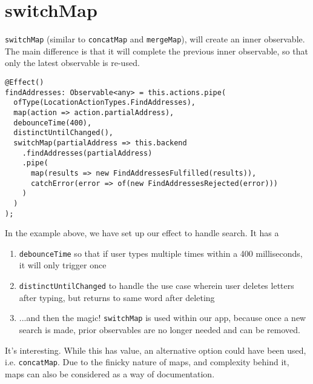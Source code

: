 \section{switchMap}
\lstinline{switchMap} (similar to \lstinline{concatMap} and \lstinline{mergeMap}),
will create an inner observable. The main difference is that it will complete 
the previous inner observable, so that only the latest observable is re-used. 

\begin{lstlisting}[caption=search-bar.component.ts]
@Effect()
findAddresses: Observable<any> = this.actions.pipe(
  ofType(LocationActionTypes.FindAddresses),
  map(action => action.partialAddress),
  debounceTime(400),
  distinctUntilChanged(),
  switchMap(partialAddress => this.backend
    .findAddresses(partialAddress)
    .pipe(
      map(results => new FindAddressesFulfilled(results)),
      catchError(error => of(new FindAddressesRejected(error)))
    )
  )
);  
\end{lstlisting}
 
In the example above, we have set up our effect to handle search. It has a 
\begin{enumerate}
  \item \lstinline{debounceTime} so that if user types multiple times within
  a 400 milliseconds, it will only trigger once
  \item \lstinline{distinctUntilChanged} to handle the use case wherein user 
  deletes letters after typing, but returns to same word after deleting
  \item ...and then the magic! \lstinline{switchMap} is used within our app,
  because once a new search is made, prior observables are no longer needed 
  and can be removed. 
\end{enumerate}

It's interesting. While this has value, an alternative option could have been 
used, i.e. \lstinline{concatMap}. Due to the finicky nature of maps, and 
complexity behind it, maps can also be considered as a way of documentation.

